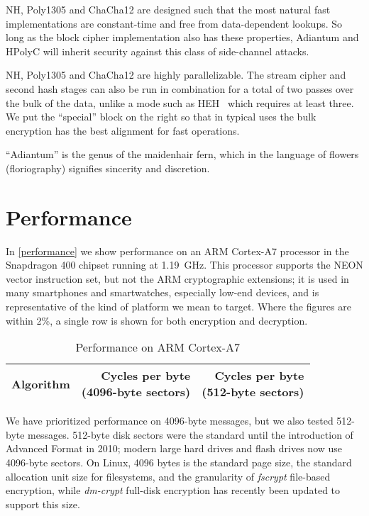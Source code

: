 \documentclass[journal=tosc,preprint,floatrow,submission]{iacrtrans}
\begin{document}
NH, Poly1305 and ChaCha12 are designed such that the most natural fast implementations are
constant-time and free from data-dependent lookups. So long as the block cipher implementation
also has these properties, Adiantum and HPolyC will inherit security against
this class of side-channel attacks.

NH, Poly1305 and ChaCha12 are highly parallelizable.
The stream cipher and second hash stages can also be run in combination for a total
of two passes over the bulk of the data, unlike a mode such as HEH~\cite{heh}
which requires at least three.
We put the ``special'' block on the right so that in typical uses the bulk encryption has
the best alignment for fast operations.

``Adiantum'' is the genus of the maidenhair fern, which in the language of
flowers (floriography) signifies sincerity and discretion.~\cite{fleurs}

\section{Performance}

In \autoref{performance} we
show performance on an ARM \mbox{Cortex-A7}
processor in the Snapdragon 400 chipset running at \mbox{1.19 GHz}.  This
processor supports the NEON vector instruction set, but not the ARM cryptographic
extensions; it is used in many smartphones and smartwatches, especially low-end
devices, and is representative of the kind of platform we mean to target.
Where the figures are within 2\%, a single row is shown for both encryption and
decryption.

\begin{table}
    \caption{Performance on ARM Cortex-A7}
    \label{performance}
    \centering
    \begin{tabular}{lrr}
        Algorithm &
            \makecell{Cycles per byte \\ (4096-byte sectors)} &
            \makecell{Cycles per byte \\ (512-byte sectors)} \\
    \hline
    
    \end{tabular}
\end{table}

We have prioritized performance on 4096-byte messages, but we also tested 512-byte messages.
512-byte disk sectors were the standard until the introduction of Advanced Format in 2010;
modern large hard drives and flash drives now use 4096-byte sectors.
On Linux, 4096 bytes is the standard page size, the standard allocation unit size for filesystems,
and the granularity of \textit{fscrypt} file-based encryption, while
\mbox{\textit{dm-crypt}} full-disk encryption has recently been updated
to support this size.
\end{document}
